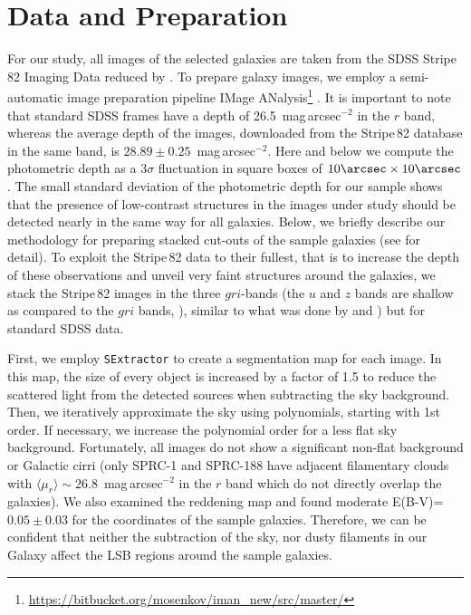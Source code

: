 \documentclass{raa}
\begin{document}
\section{Data and Preparation}
\label{sec:data}

For our study, all images of the selected galaxies are taken from the SDSS Stripe\,82 Imaging Data reduced by \citet{2014ApJS..213...12J}. To prepare galaxy images, we employ a semi-automatic image preparation pipeline IMage ANalysis\footnote{\url{https://bitbucket.org/mosenkov/iman_new/src/master/}} \citep[IMAN, see][]{2020MNRAS.497.2039M}.
It is important to note that standard SDSS frames have a depth of 26.5~mag\,arcsec$^{-2}$ in the $r$ band, whereas the average depth of the images, downloaded from the Stripe\,82 database in the same band, is $28.89\pm0.25$~mag\,arcsec$^{-2}$. Here and below we compute the photometric depth as a $3\sigma$ fluctuation in square boxes of  $10\arcsec \times 10\arcsec$. The small standard deviation of the photometric depth for our sample shows that the presence of low-contrast structures in the images under study should be detected nearly in the same way for all galaxies. Below, we briefly describe our methodology for preparing stacked cut-outs of the sample galaxies (see \citealt{2020MNRAS.497.2039M} for detail). To exploit the Stripe\,82 data to their fullest, that is to increase the depth of these observations and unveil very faint structures around the galaxies, we stack the Stripe\,82 images in the three $gri$-bands (the $u$ and $z$ bands are shallow as compared to the $gri$ bands, \citealt{1996AJ....111.1748F}), similar to what was done by \citet{2011A&A...536A..66M} and \citet{2018A&A...614A.143M}) but for standard SDSS data.

First, we employ {\tt{SExtractor}} \citep{1996A&AS..117..393B} to create a segmentation map for each image. In this map, the size of every object is increased by a factor of 1.5 to reduce the scattered light from the detected sources when subtracting the sky background. Then, we iteratively approximate the sky using polynomials, starting with 1st order. If necessary, we increase the polynomial order for a less flat sky background. Fortunately, all images do not show a significant non-flat background or Galactic cirri (only SPRC-1 and SPRC-188 have adjacent filamentary clouds with $\langle \mu_{r} \rangle\sim26.8$~mag\,arcsec$^{-2}$ in the $r$ band which do not directly overlap the galaxies). We also examined the  \citealt{1998ApJ...500..525S} reddening map and found moderate E(B-V)=$0.05\pm0.03$ for the coordinates of the sample galaxies. Therefore, we can be confident that neither the subtraction of the sky, nor dusty filaments in our Galaxy affect the LSB regions around the sample galaxies.
\end{document}
